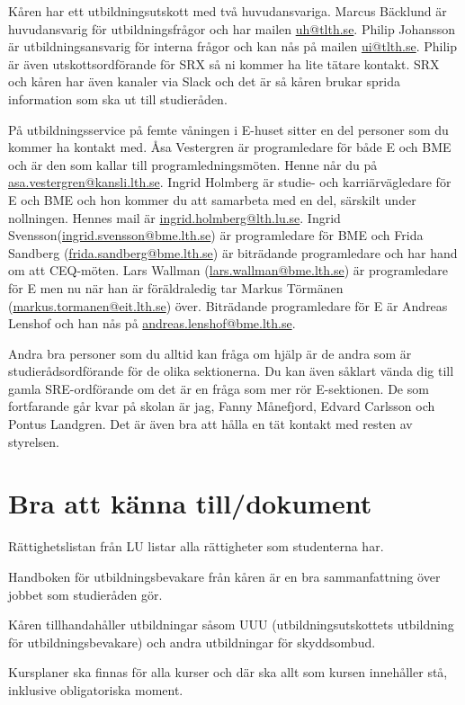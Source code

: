 \documentclass[10pt]{article}
\begin{document}
Kåren har ett utbildningsutskott med två huvudansvariga. Marcus Bäcklund är huvudansvarig för utbildningsfrågor och har mailen \href{mailto:uh@tlth.se}{uh@tlth.se}. Philip Johansson är utbildningsansvarig för interna frågor och kan nås på mailen \href{mailto:ui@tlth.se}{ui@tlth.se}. Philip är även utskottsordförande för SRX så ni kommer ha lite tätare kontakt. SRX och kåren har även kanaler via Slack och det är så kåren brukar sprida information som ska ut till studieråden.

På utbildningsservice på femte våningen i E-huset sitter en del personer som du kommer ha kontakt med. Åsa Vestergren är programledare för både E och BME och är den som kallar till programledningsmöten. Henne når du på \href{mailto:asa.vestergren@kansli.lth.se}{asa.vestergren@kansli.lth.se}. Ingrid Holmberg är studie- och karriärvägledare för E och BME och hon kommer du att samarbeta med en del, särskilt under nollningen. Hennes mail är \href{mailto:ingrid.holmberg@lth.lu.se}{ingrid.holmberg@lth.lu.se}. Ingrid Svensson(\href{mailto:ingrid.svensson@bme.lth.se}{ingrid.svensson@bme.lth.se}) är programledare för BME och Frida Sandberg (\href{mailto:frida.sandberg@bme.lth.se}{frida.sandberg@bme.lth.se}) är biträdande programledare och har hand om att CEQ-möten. Lars Wallman (\href{mailto:lars.wallman@bme.lth.se}{lars.wallman@bme.lth.se}) är programledare för E men nu när han är föräldraledig tar Markus Törmänen (\href{mailto:markus.tormanen@eit.lth.se}{markus.tormanen@eit.lth.se}) över. Biträdande programledare för E är Andreas Lenshof och han nås på \href{mailto:andreas.lenshof@bme.lth.se}{andreas.lenshof@bme.lth.se}.

Andra bra personer som du alltid kan fråga om hjälp är de andra som är studierådsordförande för de olika sektionerna. Du kan även såklart vända dig till gamla SRE-ordförande om det är en fråga som mer rör E-sektionen. De som fortfarande går kvar på skolan är jag, Fanny Månefjord, Edvard Carlsson och Pontus Landgren. Det är även bra att hålla en tät kontakt med resten av styrelsen.

\section{Bra att känna till/dokument}
\begin{dashlist}
    \item Rättighetslistan från LU listar alla rättigheter som studenterna har. 
    \item Handboken för utbildningsbevakare från kåren är en bra sammanfattning över jobbet som studieråden gör.
    \item Kåren tillhandahåller utbildningar såsom UUU (utbildningsutskottets utbildning för utbildningsbevakare) och andra utbildningar för skyddsombud.
    \item Kursplaner ska finnas för alla kurser och där ska allt som kursen innehåller stå, inklusive obligatoriska moment.
\end{dashlist}
 
\end{document}
